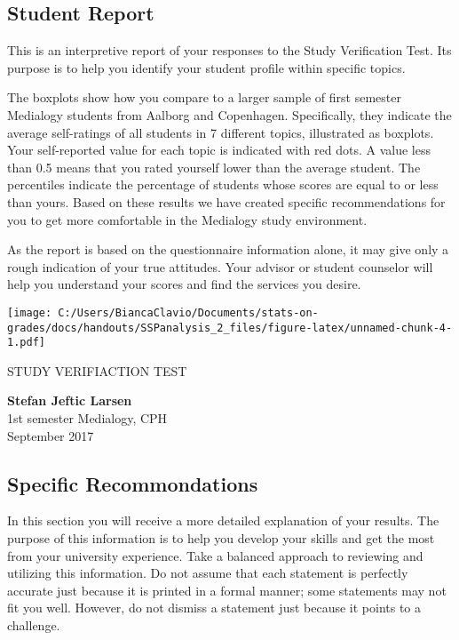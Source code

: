 \documentclass[]{article}
\title{}
\author{}
\date{}
\begin{document}
\subsection{Student Report}\label{student-report}

This is an interpretive report of your responses to the Study
Verification Test. Its purpose is to help you identify your student
profile within specific topics.

The boxplots show how you compare to a larger sample of first semester
Medialogy students from Aalborg and Copenhagen. Specifically, they
indicate the average self-ratings of all students in 7 different topics,
illustrated as boxplots. Your self-reported value for each topic is
indicated with red dots. A value less than 0.5 means that you rated
yourself lower than the average student. The percentiles indicate the
percentage of students whose scores are equal to or less than yours.
Based on these results we have created specific recommendations for you
to get more comfortable in the Medialogy study environment.

As the report is based on the questionnaire information alone, it may
give only a rough indication of your true attitudes. Your advisor or
student counselor will help you understand your scores and find the
services you desire.

\texttt{[image: C:/Users/BiancaClavio/Documents/stats-on-grades/docs/handouts/SSPanalysis\_2\_files/figure-latex/unnamed-chunk-4-1.pdf]}

\pagebreak

STUDY VERIFIACTION TEST

\textbf{Stefan Jeftic Larsen}\\
1st semester Medialogy, CPH\\
September 2017

\subsection{Specific Recommondations}\label{specific-recommondations}

In this section you will receive a more detailed explanation of your
results. The purpose of this information is to help you develop your
skills and get the most from your university experience. Take a balanced
approach to reviewing and utilizing this information. Do not assume that
each statement is perfectly accurate just because it is printed in a
formal manner; some statements may not fit you well. However, do not
dismiss a statement just because it points to a challenge.
\end{document}
